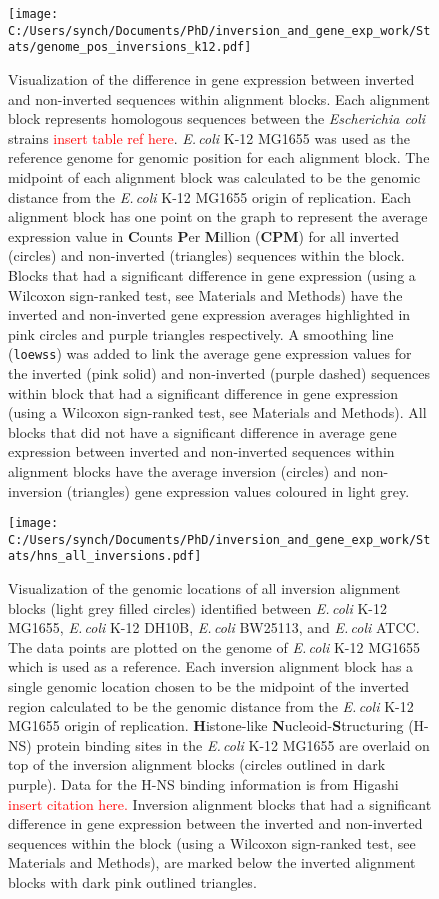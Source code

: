 \documentclass[12pt]{article}
\newcommand{\ecol}{\textit{E.\,coli}\xspace}
\newcommand{\ecoli}{\textit{Escherichia coli}\xspace}
\begin{document}
\begin{figure}
	\texttt{[image: C:/Users/synch/Documents/PhD/inversion\_and\_gene\_exp\_work/Stats/genome\_pos\_inversions\_k12.pdf]}
	\caption{\label{fig:inver_exp} Visualization of the difference in gene expression between inverted and non-inverted sequences within alignment blocks. Each alignment block represents homologous sequences between the \ecoli strains \textcolor{red}{insert table ref here}. \ecol K-12 MG1655 was used as the reference genome for genomic position for each alignment block. The midpoint of each alignment block was calculated to be the genomic distance from the \ecol K-12 MG1655 origin of replication.  Each alignment block has one point on the graph to represent the average expression value in \textbf{C}ounts \textbf{P}er \textbf{M}illion (\textbf{CPM}) for all inverted (circles) and non-inverted (triangles) sequences within the block. Blocks that had a significant difference in gene expression (using a Wilcoxon sign-ranked test, see Materials and Methods) have the inverted and non-inverted gene expression averages highlighted in pink circles and purple triangles respectively. A smoothing line (\texttt{loewss}) was added to link the average gene expression values for the inverted (pink solid) and non-inverted (purple dashed) sequences within block that had a significant difference in gene expression (using a Wilcoxon sign-ranked test, see Materials and Methods). All blocks that did not have a significant difference in average gene expression between inverted and non-inverted sequences within alignment blocks have the average inversion (circles) and non-inversion (triangles) gene expression values coloured in light grey.}
\end{figure}

\begin{figure}
	\texttt{[image: C:/Users/synch/Documents/PhD/inversion\_and\_gene\_exp\_work/Stats/hns\_all\_inversions.pdf]}
	\caption{\label{fig:inver_hns} Visualization of the genomic locations of all inversion alignment blocks (light grey filled circles) identified between \ecol K-12 MG1655, \ecol K-12 DH10B, \ecol BW25113, and \ecol ATCC.
		The data points are plotted on the genome of \ecol K-12 MG1655 which is used as a reference. Each inversion alignment block has a single genomic location chosen to be the midpoint of the inverted region calculated to be the genomic distance from the \ecol K-12 MG1655 origin of replication.
		\textbf{H}istone-like \textbf{N}ucleoid-\textbf{S}tructuring (H-NS) protein binding sites in the \ecol K-12 MG1655 are overlaid on top of the inversion alignment blocks (circles outlined in dark purple). Data for the H-NS binding information is from Higashi \textcolor{red}{insert citation here.} Inversion alignment blocks that had a significant difference in gene expression between the inverted and non-inverted sequences within the block (using a Wilcoxon sign-ranked test, see Materials and Methods), are marked below the inverted alignment blocks with dark pink outlined triangles.}
\end{figure}
\end{document}
